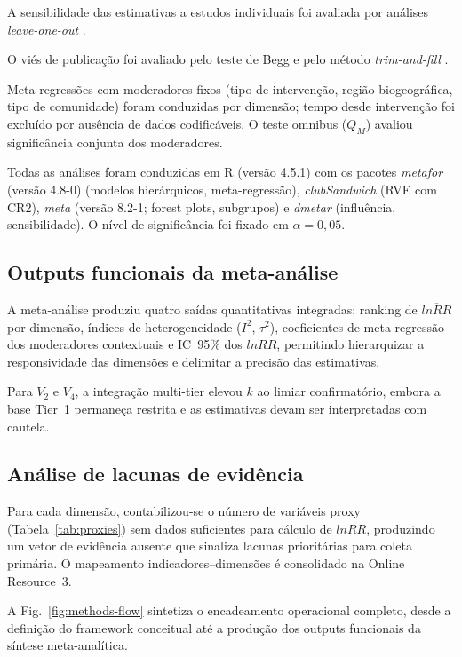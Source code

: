 \documentclass[12pt,a4paper]{article}
\begin{document}
A sensibilidade das estimativas a estudos individuais foi avaliada por análises \textit{leave-one-out} \citep{Viechtbauer2010}.

O viés de publicação foi avaliado pelo teste de Begg \citep{Begg1994} e pelo método \textit{trim-and-fill} \citep{Duval2000}.

Meta-regressões com moderadores fixos (tipo de intervenção, região biogeográfica, tipo de comunidade) foram conduzidas por dimensão; tempo desde intervenção foi excluído por ausência de dados codificáveis. O teste omnibus ($Q_M$) avaliou significância conjunta dos moderadores.

Todas as análises foram conduzidas em R (versão 4.5.1) com os pacotes \textit{metafor} (versão 4.8-0) \citep{Viechtbauer2010} (modelos hierárquicos, meta-regressão), \textit{clubSandwich} \citep{Pustejovsky2022} (RVE com CR2), \textit{meta} (versão 8.2-1; forest plots, subgrupos) e \textit{dmetar} (influência, sensibilidade). O nível de significância foi fixado em $\alpha = 0{,}05$.

\subsection{Outputs funcionais da meta-análise}
\label{sec:outputs}

A meta-análise produziu quatro saídas quantitativas integradas: ranking de $\overline{lnRR}$ por dimensão, índices de heterogeneidade ($I^2$, $\tau^2$), coeficientes de meta-regressão dos moderadores contextuais e IC~95\% dos $lnRR$, permitindo hierarquizar a responsividade das dimensões e delimitar a precisão das estimativas.

Para $V_2$ e $V_4$, a integração multi-tier elevou $k$ ao limiar confirmatório, embora a base Tier~1 permaneça restrita e as estimativas devam ser interpretadas com cautela.

\subsection{Análise de lacunas de evidência}
\label{sec:gaps}

Para cada dimensão, contabilizou-se o número de variáveis proxy (Tabela~\ref{tab:proxies}) sem dados suficientes para cálculo de $lnRR$, produzindo um vetor de evidência ausente que sinaliza lacunas prioritárias para coleta primária. O mapeamento indicadores--dimensões é consolidado na Online Resource~3.

A Fig.~\ref{fig:methods-flow} sintetiza o encadeamento operacional completo, desde a definição do framework conceitual até a produção dos outputs funcionais da síntese meta-analítica.
\end{document}
